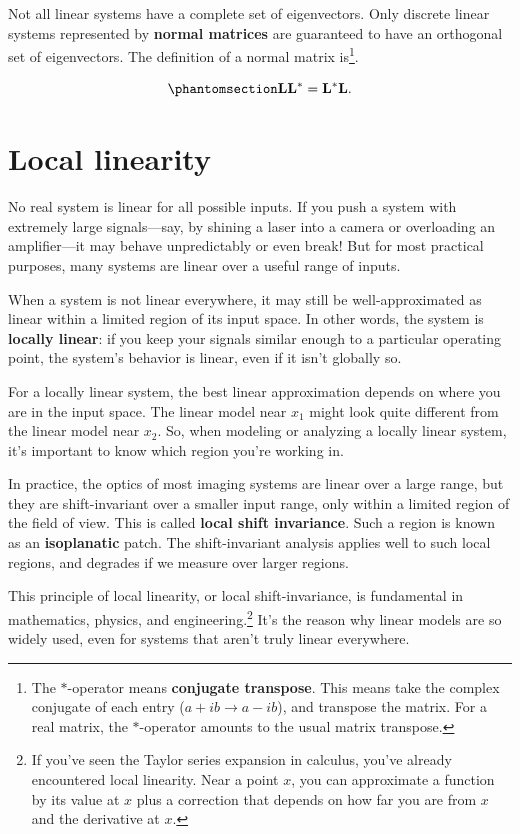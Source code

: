 \documentclass[
  letterpaper,
]{book}
\begin{document}
Not all linear systems have a complete set of eigenvectors. Only
discrete linear systems represented by \textbf{normal matrices} are
guaranteed to have an orthogonal set of eigenvectors. The definition of
a normal matrix is\footnote{The \(*\)-operator means \textbf{conjugate
  transpose}. This means take the complex conjugate of each entry
  (\(a + ib \rightarrow a - ib\)), and transpose the matrix. For a real
  matrix, the \(*\)-operator amounts to the usual matrix transpose.}.

\begin{equation}\phantomsection\label{eq-normal-matrix-definition}{
\mathbf{L L^* = L^* L} .
}\end{equation}

\section{Local linearity}\label{sec-ls-local-linearity}

No real system is linear for all possible inputs. If you push a system
with extremely large signals---say, by shining a laser into a camera or
overloading an amplifier---it may behave unpredictably or even break!
But for most practical purposes, many systems are linear over a useful
range of inputs.

When a system is not linear everywhere, it may still be
well-approximated as linear within a limited region of its input space.
In other words, the system is \textbf{locally linear}: if you keep your
signals similar enough to a particular operating point, the system's
behavior is linear, even if it isn't globally so.

For a locally linear system, the best linear approximation depends on
where you are in the input space. The linear model near \(x_1\) might
look quite different from the linear model near \(x_2\). So, when
modeling or analyzing a locally linear system, it's important to know
which region you're working in.

In practice, the optics of most imaging systems are linear over a large
range, but they are shift-invariant over a smaller input range, only
within a limited region of the field of view. This is called
\textbf{local shift invariance}. Such a region is known as an
\textbf{isoplanatic} patch. The shift-invariant analysis applies well to
such local regions, and degrades if we measure over larger regions.

This principle of local linearity, or local shift-invariance, is
fundamental in mathematics, physics, and engineering.\footnote{If you've
  seen the Taylor series expansion in calculus, you've already
  encountered local linearity. Near a point \(x\), you can approximate a
  function by its value at \(x\) plus a correction that depends on how
  far you are from \(x\) and the derivative at \(x\).} It's the reason
why linear models are so widely used, even for systems that aren't truly
linear everywhere.
\end{document}

